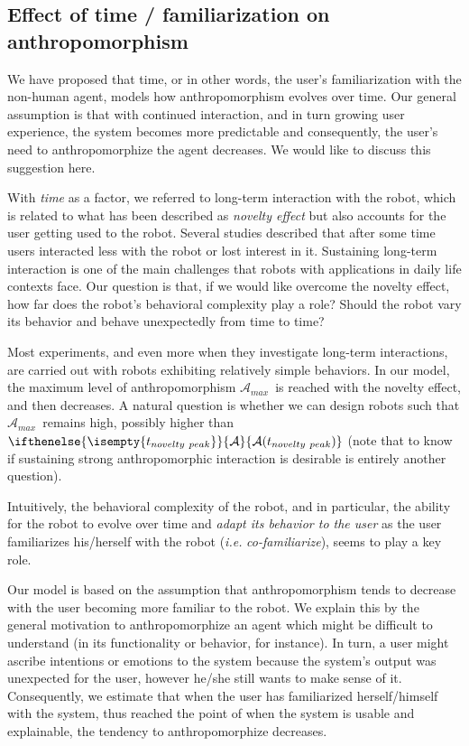 \documentclass{frontiersSCNS} %
\newcommand{\ie}{\textit{i.e.}\xspace}
\newcommand{\ant}[1][]{%
      \ifthenelse{\isempty{#1}}%
        {\mathcal{A}}
        {\mathcal{A}(#1)}
}
\newcommand{\AntMax}{{$\mathcal{A}_{max}$~}}
\begin{document}
\subsection{Effect of time / familiarization on anthropomorphism}

We have proposed that time, or in other words, the user's familiarization with
the non-human agent, models how anthropomorphism evolves over time. Our general
assumption is that with continued interaction, and in turn growing user
experience, the system becomes more predictable and consequently, the user's
need to anthropomorphize the agent decreases. We would like to discuss this
suggestion here.

With \textit{time} as a factor, we referred to long-term interaction with the
robot, which is related to what has been described as \textit{novelty effect}
but also accounts for the user getting used to the robot. Several studies
described that after some time users interacted less with the robot or lost
interest in it. Sustaining long-term interaction is one of the main challenges
that robots with applications in daily life contexts face. Our question is that,
if we would like overcome the novelty effect, how far does the robot's
behavioral complexity play a role? Should the robot vary its behavior and behave
unexpectedly from time to time?

Most experiments, and even more when they investigate long-term interactions,
are carried out with robots exhibiting relatively simple behaviors. In our
model, the maximum level of anthropomorphism \AntMax is reached with the novelty
effect, and then decreases. A natural question is whether we can design robots
such that \AntMax remains high, possibly higher than $\ant[t_{novelty~peak}]$
(note that to know if sustaining strong anthropomorphic interaction is desirable
is entirely another question).

Intuitively, the behavioral complexity of the robot, and in particular, the
ability for the robot to evolve over time and \emph{adapt its behavior to the
user} as the user familiarizes his/herself with the robot (\ie
\emph{co-familiarize}), seems to play a key role.

Our model is based on the assumption that anthropomorphism tends to decrease
with the user becoming more familiar to the robot.  We explain this by the
general motivation to anthropomorphize an agent which might be difficult to
understand (in its functionality or behavior, for instance). In turn, a user
might ascribe intentions or emotions to the system because the system's output
was unexpected for the user, however he/she still wants to make sense of it.
Consequently, we estimate that when the user has familiarized herself/himself
with the system, thus reached the point of when the system is usable and
explainable, the tendency to anthropomorphize decreases. 
\end{document}
